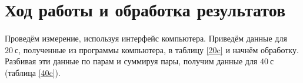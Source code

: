 \documentclass[a4paper, 12pt]{article}
\begin{document}
    \section{Ход работы и обработка результатов}
    \paragraph{}
    Проведём измерение, используя интерфейс компьютера. Приведём данные для $20 \ с$, полученные из программы компьютера, в таблицу \ref{20c} и начнём  обработку. Разбивая эти данные по парам и суммируя пары, получим данные для $40 \ с$ (таблица \ref{40c}).
    \paragraph{}
    
\end{document}
